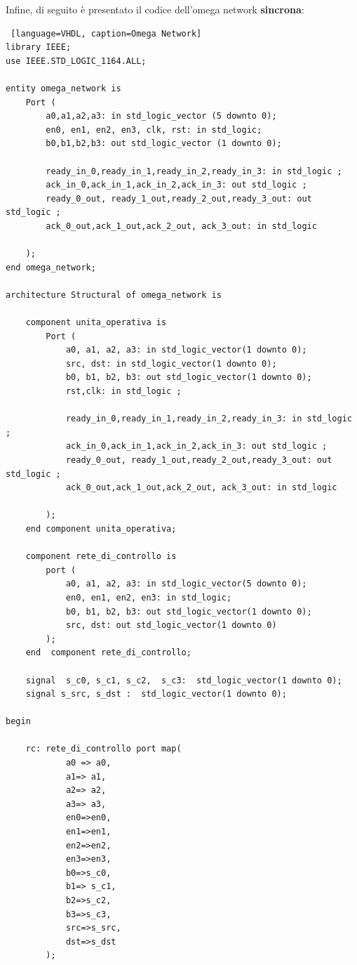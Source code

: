 Infine, di seguito è presentato il codice dell'omega network \textbf{sincrona}:
\begin{lstlisting} [language=VHDL, caption=Omega Network]
library IEEE;
use IEEE.STD_LOGIC_1164.ALL;

entity omega_network is
    Port (
        a0,a1,a2,a3: in std_logic_vector (5 downto 0);
        en0, en1, en2, en3, clk, rst: in std_logic;
        b0,b1,b2,b3: out std_logic_vector (1 downto 0);

        ready_in_0,ready_in_1,ready_in_2,ready_in_3: in std_logic ;
        ack_in_0,ack_in_1,ack_in_2,ack_in_3: out std_logic ;
        ready_0_out, ready_1_out,ready_2_out,ready_3_out: out std_logic ;
        ack_0_out,ack_1_out,ack_2_out, ack_3_out: in std_logic

    );
end omega_network;

architecture Structural of omega_network is

    component unita_operativa is
        Port (
            a0, a1, a2, a3: in std_logic_vector(1 downto 0);
            src, dst: in std_logic_vector(1 downto 0);
            b0, b1, b2, b3: out std_logic_vector(1 downto 0);
            rst,clk: in std_logic ;

            ready_in_0,ready_in_1,ready_in_2,ready_in_3: in std_logic ;
            ack_in_0,ack_in_1,ack_in_2,ack_in_3: out std_logic ;
            ready_0_out, ready_1_out,ready_2_out,ready_3_out: out std_logic ;
            ack_0_out,ack_1_out,ack_2_out, ack_3_out: in std_logic

        );
    end component unita_operativa;

    component rete_di_controllo is
        port (
            a0, a1, a2, a3: in std_logic_vector(5 downto 0);
            en0, en1, en2, en3: in std_logic;
            b0, b1, b2, b3: out std_logic_vector(1 downto 0);
            src, dst: out std_logic_vector(1 downto 0)
        );
    end  component rete_di_controllo;

    signal  s_c0, s_c1, s_c2,  s_c3:  std_logic_vector(1 downto 0);
    signal s_src, s_dst :  std_logic_vector(1 downto 0);

begin

    rc: rete_di_controllo port map(
            a0 => a0,
            a1=> a1,
            a2=> a2,
            a3=> a3,
            en0=>en0,
            en1=>en1,
            en2=>en2,
            en3=>en3,
            b0=>s_c0,
            b1=> s_c1,
            b2=>s_c2,
            b3=>s_c3,
            src=>s_src,
            dst=>s_dst
        );


\end{lstlisting}
